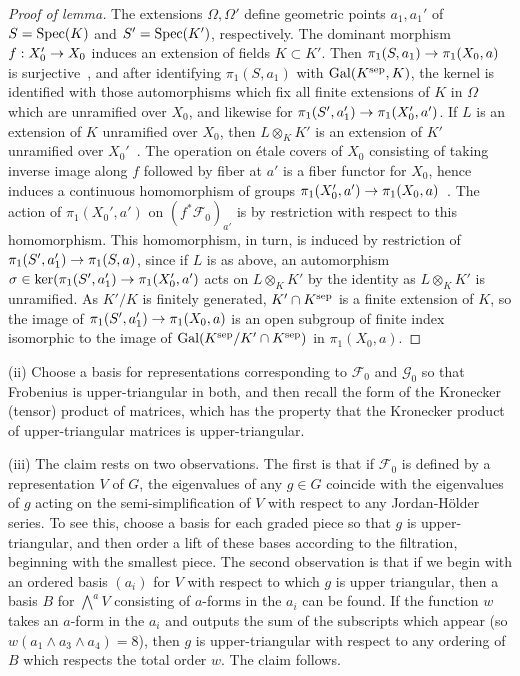 \documentclass[deligne.tex]{subfiles}
\begin{document}
\begin{proof}[Proof of lemma]
The extensions $\Omega,\Omega'$ define geometric points $a_1,a_1'$ of $S=\operatorname{Spec}(K)$ and $S'=\operatorname{Spec}(K')$, respectively.
The dominant morphism $f:X_0'\rightarrow X_0$ 
induces an extension of fields $K\subset K'$.
Then $\pi_1(S,a_1)\rightarrow\pi_1(X_0,a)$ is surjective~\cite[V 8.2]{SGA1}, and after identifying
$\pi_1(S,a_1)$ with $\operatorname{Gal}({K}^{\mathrm{sep}},K)$, the kernel is identified with those
automorphisms which fix all finite extensions of $K$ in $\Omega$ which
are unramified over $X_0$, and likewise for
$\pi_1(S',a_1')\rightarrow\pi_1(X_0',a')$. If $L$ is
an extension of $K$ unramified over $X_0$, then $L\otimes_K K'$ is an
extension of $K'$ unramified over $X_0'$~\cite[I 10.4(iii)]{SGA1}.
The operation on étale covers of $X_0$ consisting of taking inverse image
along $f$ followed by fiber at $a'$ is a fiber functor for $X_0$, hence
induces a continuous homomorphism of groups
$\pi_1(X_0',a')\rightarrow\pi_1(X_0,a)$~\cite[V 6.2]{SGA1}. The action of 
$\pi_1(X_0',a')$ on $(f^\ast\mathscr F_0)_{a'}$ is by restriction with 
respect to this homomorphism. This homomorphism, in turn, is induced by
restriction of $\pi_1(S',a_1')\rightarrow\pi_1(S,a)$, since if $L$ is as above, an 
automorphism $\sigma\in\ker(\pi_1(S',a_1')\rightarrow\pi_1(X_0',a')$ acts on
$L\otimes_K K'$ by the identity as $L\otimes_K K'$ is unramified. 
As $K'/K$ is finitely generated, $K'\cap{K}^{\mathrm{sep}}$ is a finite extension of
$K$, so the image of $\pi_1(S',a_1')\rightarrow\pi_1(X_0,a)$ is an open subgroup
of finite index isomorphic to the image of $\operatorname{Gal}({K}^{\mathrm{sep}}/K'\cap{K}^{\mathrm{sep}})$
in $\pi_1(X_0,a)$.
\end{proof}
(ii) Choose a basis for representations corresponding to
$\mathscr F_0$ and $\mathscr G_0$ so that Frobenius is upper-triangular in
both, and then recall the form of the Kronecker (tensor) product of 
matrices, which has the property that the Kronecker product of 
upper-triangular matrices is upper-triangular.

(iii) The claim rests on two observations. The first is that if 
$\mathscr F_0$ is defined by a representation $V$ of $G$, the eigenvalues
of any $g\in G$ coincide with the eigenvalues of $g$ acting on the
semi-simplification of $V$ with respect to any Jordan-Hölder series.
To see this, choose a basis for each graded piece so that $g$ is
upper-triangular, and then order a lift of these bases according to the
filtration, beginning with the smallest piece. 
The second observation is that if we begin with an ordered basis $(a_i)$ for 
$V$ with respect to which $g$ is upper triangular, then a basis $B$ for 
$\bigwedge^aV$ consisting of $a$-forms in the $a_i$ can be found.
If the function $w$ takes an $a$-form in the $a_i$ and outputs the sum of
the subscripts which appear (so $w(a_1\wedge a_3\wedge a_4)=8$),
then $g$ is upper-triangular with respect to any ordering of $B$ which
respects the total order $w$. The claim follows.
\end{document}
